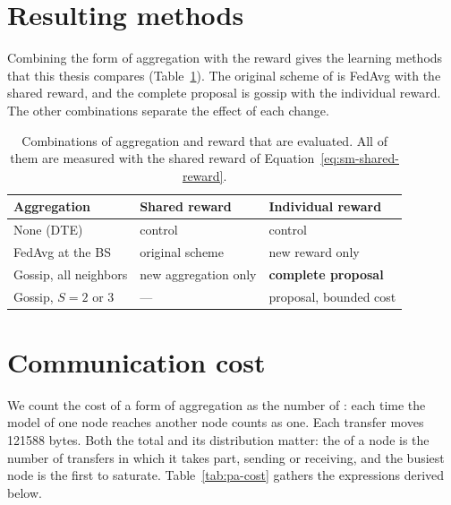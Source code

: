 \section{Resulting methods}
\label{sec:pa-methods}

Combining the form of aggregation with the reward gives the learning methods that this thesis compares
(Table~\ref{tab:pa-methods}). The original scheme of \citet{li+22fedmarl} is \ac{FedAvg} with the shared
reward, and the complete proposal is gossip with the individual reward. The other combinations separate the
effect of each change.

\begin{table}[tbp]
  \centering
  \footnotesize
  \caption[Combinations of aggregation and reward]{Combinations of aggregation and reward that are
    evaluated. All of them are measured with the shared reward of Equation~\ref{eq:sm-shared-reward}.}
  \label{tab:pa-methods}
  \begin{tabularx}{\linewidth}{@{}l >{\raggedright\arraybackslash}X >{\raggedright\arraybackslash}X@{}}
    \toprule
    Aggregation & Shared reward & Individual reward \\
    \midrule
    None (\acs{DTE}) & control & control \\
    \acs{FedAvg} at the \acs{BS} & original scheme & new reward only \\
    Gossip, all neighbors & new aggregation only & \textbf{complete proposal} \\
    Gossip, $S = 2$ or 3 & --- & proposal, bounded cost \\
    \bottomrule
  \end{tabularx}
\end{table}

\section{Communication cost}
\label{sec:pa-comm-cost}

We count the cost of a form of aggregation as the number of : each time the model of one
node reaches another node counts as one. Each transfer moves \num{121588} bytes. Both the total and its
distribution matter: the  of a node is the number of transfers in which it takes part, sending
or receiving, and the busiest node is the first to saturate. Table~\ref{tab:pa-cost} gathers the expressions
derived below.

